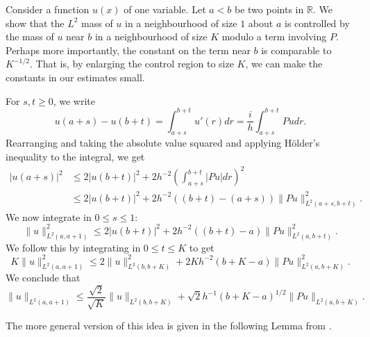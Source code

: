 \documentclass[twoside, final]{amsart}
\theoremstyle{definition}
\numberwithin{equation}{section}
\begin{document}
Consider a function $u(x)$ of one variable.  Let $a < b$ be two points
in ${{\mathbb R}}$.  We show that the $L^2$ mass of $u$ in a neighbourhood of
size $1$ about $a$ is controlled by the mass of $u$ near $b$ in a
neighbourhood of size $K$ modulo a term involving $P$.  Perhaps more
importantly, the constant on the term near $b$ is comparable to
$K^{-1/2}$.  That is, by enlarging the control region to size $K$, we
can make the constants in our estimates small.

For $s,t {\geqslant} 0$, we write
\[
u(a+s) - u(b+t) = \int_{a+s}^{b+t} u'(r) dr = \frac{i}{h}
\int_{a+s}^{b+t} P u dr.
\]
Rearranging and taking the absolute value squared and applying
H\"older's inequality to the integral, we get
\begin{align*}
| u(a+s)|^2 & {\leqslant} 2 | u(b+t)|^2 + 2 h^{-2} \left( \int_{a+s}^{b+t} | P u |
  dr \right)^2 \\
& {\leqslant}  2 | u(b+t)|^2 + 2 h^{-2} ((b+t) - (a+s) )  \| P u \|_{L^2(a+s, b+t)}^2 .
\end{align*}
We now integrate in $0 {\leqslant} s {\leqslant} 1$:
\[
\| u \|_{L^2(a,a+1)}^2 {\leqslant} 2 | u(b+t) |^2 + 2 h^{-2} ((b+t) - a )  \|
P u \|_{L^2(a, b+t)}^2.
\]
We follow this by integrating in $0 {\leqslant} t {\leqslant} K$ to get
\[
K \| u \|_{L^2(a,a+1)}^2 {\leqslant} 2 \| u \|_{L^2(b, b+K)}^2 + 2 K h^{-2} (b +K- a )  \|
P u \|_{L^2(a, b+K)}^2.
\]
We conclude that
\[
 \| u \|_{L^2(a,a+1)} {\leqslant} \frac{\sqrt{2}}{\sqrt{K}} \| u \|_{L^2(b,
   b+K)} + \sqrt{2} h^{-1} (b +K - a )^{1/2}  \|
P u \|_{L^2(a, b+K)}.
\]

The more general version of this idea is given in the following Lemma
from \cite{Chr-disp-1}.
\end{document}
